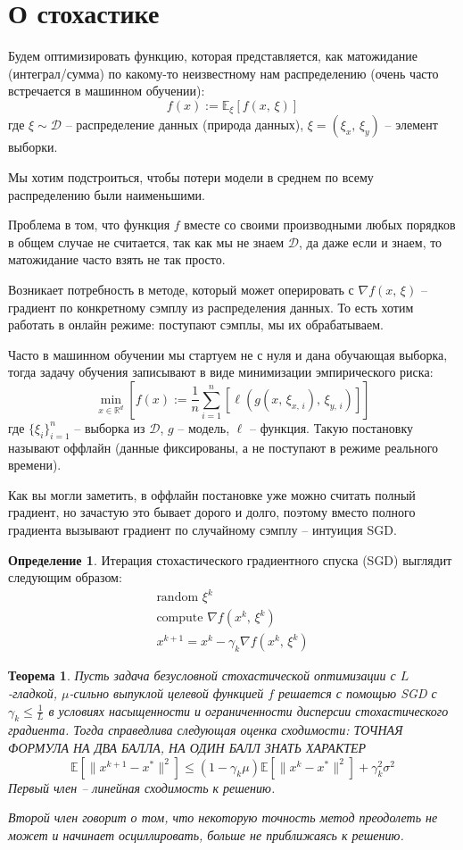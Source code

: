 \documentclass[a4paper,12pt]{article}
\renewcommand{\leq}{\ensuremath{\leqslant}}
\theoremstyle{plain}
\newtheorem{theorem}{Теорема}[section]
\theoremstyle{definition}
\newtheorem{definition}{Определение}[section]
\theoremstyle{remark}
\begin{document}
\section{О стохастике}
Будем оптимизировать функцию, которая представляется, как матожидание (интеграл/сумма) по какому-то неизвестному нам распределению (очень часто встречается в машинном обучении):
\[
  f(x) := \mathbb{E}_{\xi}[f(x,\, \xi)]
\]
где $\xi \sim \mathcal{D}$ -- распределение данных (природа данных), $\xi = (\xi_x,\, \xi_y)$ -- элемент выборки.

Мы хотим подстроиться, чтобы потери модели в среднем по всему распределению были наименьшими.

Проблема в том, что функция $f$ вместе со своими производными любых порядков в общем случае не считается, так как мы не знаем $\mathcal{D}$, да даже если и знаем, то матожидание часто взять не так просто.

Возникает потребность в методе, который может оперировать с $\nabla f(x,\, \xi)$ -- градиент по конкретному сэмплу из распределения данных. То есть хотим работать в онлайн режиме: поступают сэмплы, мы их обрабатываем.

Часто в машинном обучении мы стартуем не с нуля и дана обучающая выборка, тогда задачу обучения записывают в виде минимизации эмпирического риска:
\[
  \min_{x \in \mathbb{R}^d}\left[f(x) := \frac{1}{n}\sum_{i = 1}^n [\ell(g(x,\, \xi_{x,\, i}),\, \xi_{y,\,i})]\right]
\]
где $\{\xi_i\}_{i = 1}^n$ -- выборка из $\mathcal{D}$, $g$ -- модель, $\ell$ -- функция. Такую постановку называют оффлайн (данные фиксированы, а не поступают в режиме реального времени).

Как вы могли заметить, в оффлайн постановке уже можно считать полный градиент, но зачастую это бывает дорого и долго, поэтому вместо полного градиента вызывают градиент по случайному сэмплу -- интуиция SGD.

\begin{definition}
  Итерация стохастического градиентного спуска (SGD) выглядит следующим образом:
  \begin{align*}
    \text{random }\xi^k\\
    \text{compute }\nabla f(x^k,\, \xi^k)\\
    x^{k + 1} = x^k - \gamma_k \nabla f(x^k,\, \xi^k) 
  \end{align*}
\end{definition}

\begin{theorem}
  Пусть задача безусловной стохастической оптимизации с $L$-гладкой, $\mu$-сильно выпуклой целевой функцией $f$ решается с помощью SGD с $\gamma_k \leq \frac{1}{L}$ в условиях насыщенности и ограниченности дисперсии стохастического градиента. Тогда справедлива следующая оценка сходимости: ТОЧНАЯ ФОРМУЛА НА ДВА БАЛЛА, НА ОДИН БАЛЛ ЗНАТЬ ХАРАКТЕР
  \[
    \mathbb{E}\left[\|x^{k + 1} - x^*\|^2\right] \leq (1 - \gamma_k\mu)\mathbb{E}\left[\|x^k - x^*\|^2\right] + \gamma_k^2\sigma^2
  \]
  Первый член -- линейная сходимость к решению.

  Второй член говорит о том, что некоторую точность метод преодолеть не может и начинает осциллировать, больше не приближаясь к решению.
\end{theorem}
\end{document}
